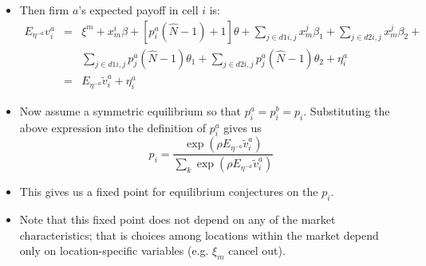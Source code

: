 \begin{frame}%


\begin{itemize}
\item Then firm $a$'s expected payoff in cell $i$ is: 
\begin{eqnarray*}
E_{\eta ^{-a}}v_{i}^{a} &=&\xi ^{m}+x_{m}^{i}\beta +[p_{i}^{a}(\hat{N}%
-1)+1]\theta +\sum_{j\in d1i,j}x_{m}^{j}\beta _{1}+\sum_{j\in
d2i,j}x_{m}^{j}\beta _{2}+ \\
&&\sum_{j\in d1i,j}p_{j}^{a}(\hat{N}-1)\theta _{1}+\sum_{j\in
d2i,j}p_{j}^{a}(\hat{N}-1)\theta _{2}+\eta _{i}^{a} \\
&=&E_{\eta ^{-a}}\tilde{v}_{i}^{a}+\eta _{i}^{a}
\end{eqnarray*}

\item Now assume a symmetric equilibrium so that $p_{i}^{a}=p_{i}^{b}=p_{i}.$
Substituting the above expression into the definition of $p_{i}^{a}$ gives
us 
\begin{equation*}
p_{i}=\frac{\exp (\rho E_{\eta ^{-a}}\tilde{v}_{i}^{a})}{\sum_{k}\exp (\rho
E_{\eta ^{-a}}\tilde{v}_{i}^{a})}
\end{equation*}

\item This gives us a fixed point for equilibrium conjectures on the $p_{i}$.

\item Note that this fixed point does not depend on any of the market
characteristics; that is choices among locations within the market depend
only on location-specific variables (e.g. $\xi _{m}$ cancel out).
\end{itemize}

\end{frame}%

